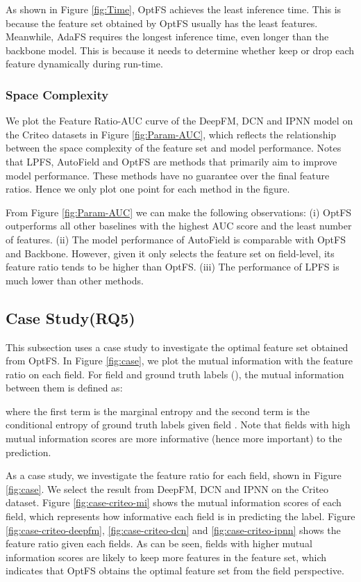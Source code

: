 \documentclass[sigconf]{acmart}
\begin{document}
As shown in Figure \ref{fig:Time}, OptFS achieves the least inference time. This is because the feature set obtained by OptFS usually has the least features. Meanwhile, AdaFS requires the longest inference time, even longer than the backbone model. This is because it needs to determine whether keep or drop each feature dynamically during run-time.


\subsubsection{Space Complexity}
We plot the Feature Ratio-AUC curve of the DeepFM, DCN and IPNN model on the Criteo datasets in Figure \ref{fig:Param-AUC}, which reflects the relationship between the space complexity of the feature set and model performance. Notes that LPFS, AutoField and OptFS are methods that primarily aim to improve model performance. These methods have no guarantee over the final feature ratios. Hence we only plot one point for each method in the figure.

From Figure \ref{fig:Param-AUC} we can make the following observations: (i) OptFS outperforms all other baselines with the highest AUC score and the least number of features. (ii) The model performance of AutoField is comparable with OptFS and Backbone. However, given it only selects the feature set on field-level, its feature ratio tends to be higher than OptFS. (iii) The performance of LPFS is much lower than other methods.


\subsection{Case Study(RQ5)}

This subsection uses a case study to investigate the optimal feature set obtained from OptFS. In Figure \ref{fig:case}, we plot the mutual information with the feature ratio on each field. For field  and ground truth labels  (), the mutual information between them is defined as:

where the first term is the marginal entropy and the second term is the conditional entropy of ground truth labels  given field . Note that fields with high mutual information scores are more informative (hence more important) to the prediction. 

As a case study, we investigate the feature ratio for each field, shown in Figure \ref{fig:case}. We select the result from DeepFM, DCN and IPNN on the Criteo dataset. Figure \ref{fig:case-criteo-mi} shows the mutual information scores of each field, which represents how informative each field is in predicting the label. Figure \ref{fig:case-criteo-deepfm}, \ref{fig:case-criteo-dcn} and \ref{fig:case-criteo-ipnn} shows the feature ratio given each fields. As can be seen, fields with higher mutual information scores are likely to keep more features in the feature set, which indicates that OptFS obtains the optimal feature set from the field perspective.
\end{document}
